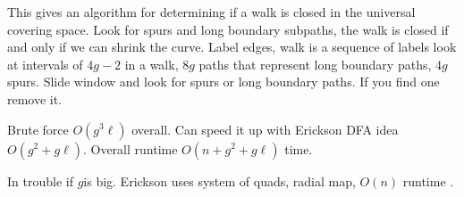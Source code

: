This gives an algorithm for determining if a walk is closed in the universal
covering space.
Look for spurs and long boundary subpaths, the walk is closed if and  only if
we can  shrink the curve.
Label edges, walk is a sequence of labels
look at intervals of $4g-2$ in a walk, $8g$ paths
that represent long boundary paths, $4g$ spurs.
Slide window and look for spurs or long boundary paths.
If you find one remove it.

Brute force $O(g^3\ell)$ overall.
Can speed it up with Erickson DFA  idea
$O(g^2+g\ell)$.
Overall runtime $O(n+g^2+g\ell)$ time.

In trouble if $g$is big. Erickson uses system of quads,
radial map, $O(n)$ runtime  \cite{erickson-whittlesey-2013}.





